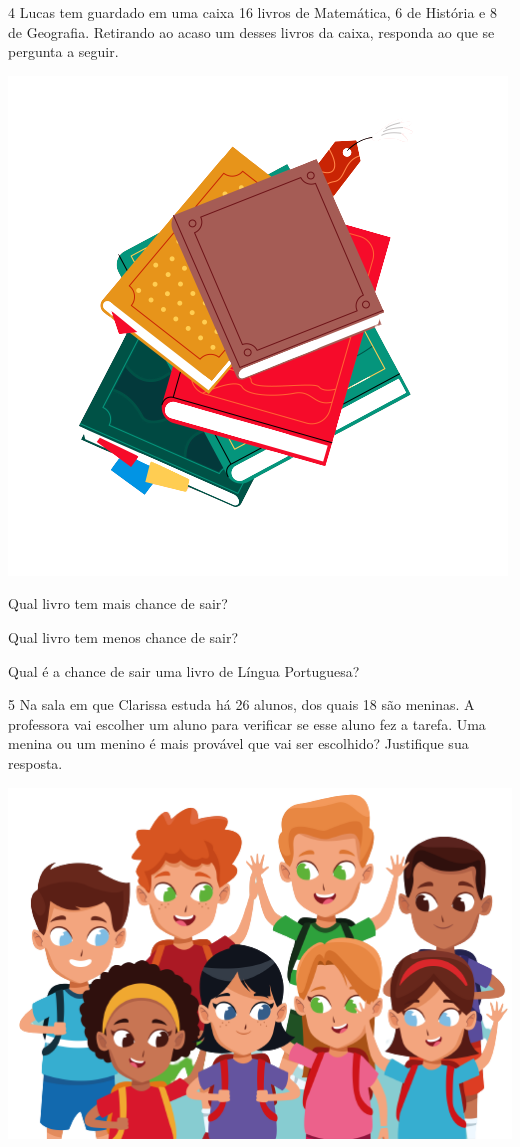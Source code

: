 \num{4} Lucas tem guardado em uma caixa 16 livros de Matemática, 6 de História e
8 de Geografia. Retirando ao acaso um desses livros da caixa, responda ao que se pergunta a seguir.

\begin{center}
\includegraphics[width=.5\textwidth]{media/image37f.png}
\end{center}

\begin{escolha}
\item
  Qual livro tem mais chance de sair?\\

\item
  Qual livro tem menos chance de sair?\\

\item
  Qual é a chance de sair uma livro de Língua Portuguesa?\\
\end{escolha}

\num{5} Na sala em que Clarissa estuda há 26 alunos, dos quais 18 são meninas. A
professora vai escolher um aluno para verificar se esse aluno fez a tarefa.
Uma menina ou um menino é mais provável que vai ser escolhido? Justifique sua resposta.

\begin{center}
\includegraphics[width=\textwidth]{media/image37g.png}
\end{center}

